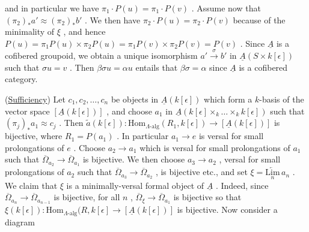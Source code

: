 \begin{center}
\end{center}
and in particular we have $\pi_1\cdot P(u) = \pi_1\cdot P(v)$ . Assume now that $(\pi_2)_*a' \approx (\pi_2)_*b'$ . We then have $\pi_2\cdot P(u) = \pi_2\cdot P(v)$ because of the minimality of
$\xi$ , and hence  $P(u) = \pi_1 P(u)\times \pi_2 P(u) = \pi_1 P(v)\times \pi_2 P(v) = P(v)$  . Since  $\underline{A}$  is a cofibered groupoid, we obtain a unique isomorphism  $a' \overset{\sigma}{\to} b'$  in $\underline{A}(S\times k[\epsilon])$  such that  $\sigma u = v$  . Then  $\beta\sigma u = \alpha u$  entails that  $\beta\sigma= \alpha$  since  $\underline{A}$ is a cofibered category.

(\underline{Sufficiency}) Let  $c_1,c_2,\dots,c_n$  be objects in  $\underline{A}(k[\epsilon])$  which form a $k$-basis of the vector space  $[\underline{A}(k[\epsilon])]$  , and choose  $a_1$  in  $\underline{A}(k[\epsilon]\times_k\dots\times_k k[\epsilon])$ such that  $(\pi_j)_* a_1 \approx c_j$  . Then  $\tilde{a}(k[\epsilon]) : \mathrm{Hom}_{\Lambda\text{-alg}}(R_1,k[\epsilon]) \to [\underline{A}(k[\epsilon])]$  is bijective, where  $R_1 = P(a_1)$  . In particular  $a_1 \to e$  is versal for small prolongations of  $e$  . Choose  $a_2 \to a_1$  which is versal for small prolongations of  $a_1$ such that  $\overline{\Omega}_{a_2} \to \overline{\Omega}_{a_1}$  is bijective. We then choose  $a_3 \to a_2$  , versal for small prolongations of  $a_2$  such that  $\overline{\Omega}_{a_3} \to \overline{\Omega}_{a_2}$  , is bijective etc., and set $\xi = \underset{n}{\underleftarrow{\mathrm{Lim}}}\, a_n$  . We claim that  $\xi$  is a minimally-versal formal object of  $\underline{A}$  . Indeed, since  $\overline{\Omega}_{a_n} \to \overline{\Omega}_{a_{n-1}}$  is bijective, for all  $n$  ,  $\overline{\Omega}_{\xi} \to \overline{\Omega}_{a_1}$  is bijective so that $\xi(k[\epsilon]) : \mathrm{Hom}_{\Lambda\text{-alg}}(R,k[\epsilon] \to [\underline{A}(k[\epsilon])]$  is bijective. Now consider a diagram

